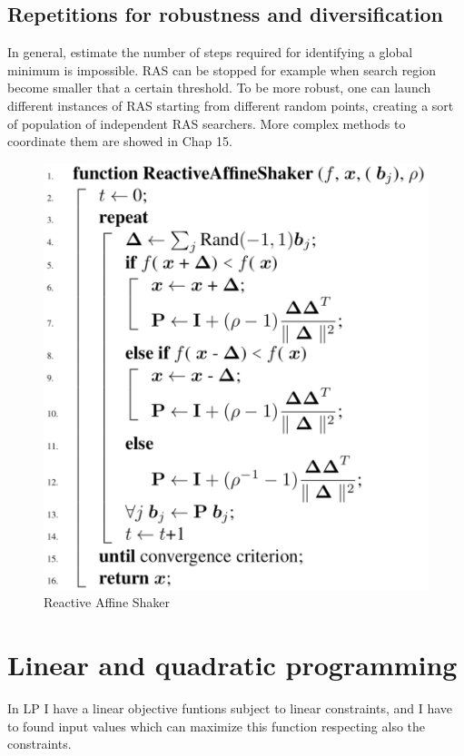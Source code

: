 \documentclass[11pt]{article}
\begin{document}
\subsection{Repetitions for robustness and diversification}

In general, estimate the number of steps required for identifying a global minimum is impossible. RAS can be stopped for example when search region become smaller that a certain threshold. To be more robust, one can launch different instances of RAS starting from different random points, creating a sort of population of independent RAS searchers. More complex methods to coordinate them are showed in Chap 15.

\begin{figure}[H]
\includegraphics[scale=0.25]{ras}
\caption{Reactive Affine Shaker}
\centering
\label{fig:ras}
\end{figure}

\section{Linear and quadratic programming}

In LP I have a linear objective funtions subject to linear constraints, and I have to found input values which can maximize this function respecting also the constraints. 
\end{document}
